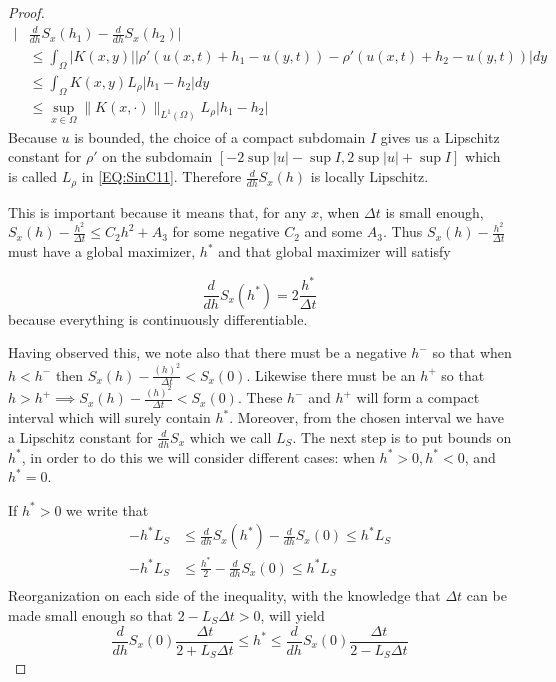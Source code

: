 \documentclass[aps,
preprint,
groupedaddress,
showkeys,
amsmath]{revtex4-2}
\begin{document}
\begin{proof}
\begin{equation}
\begin{split}
            \bigg|&\frac{d}{dh}S_x(h_1)-\frac{d}{dh}S_x(h_2)\bigg|\\
            &\leq \int_\Omega |K(x,y)| |\rho'(u(x,t)+h_1-u(y,t))-\rho'(u(x,t)+h_2-u(y,t))|dy\\
            &\leq \int_\Omega K(x,y)L_{\rho}|h_1-h_2|dy\\
            &\leq \sup_{x\in\Omega}\|K(x,\cdot)\|_{L^1(\Omega)}L_{\rho}|h_1-h_2|
            \end{split} 
        \end{equation}
        Because $u$ is bounded, the choice of a compact subdomain $I$ gives us a Lipschitz constant for $\rho'$ on the subdomain $[-2\sup |u|-\sup I,2\sup|u|+\sup I]$ which is called $L_\rho$ in \eqref{EQ:SinC11}. Therefore $\frac{d}{dh}S_x(h)$ is locally Lipschitz. 

        This is important because it means that, for any $x$, when $\Delta t$ is small enough, $S_x(h)-\frac{h^2}{\Delta t}\leq C_2h^2+A_3$ for some negative $C_2$ and some $A_3$. Thus $S_x(h)-\frac{h^2}{\Delta t}$ must have a global maximizer, $h^*$ and that global maximizer will satisfy 
        
       \[\frac{d}{dh}S_x(h^*)=2\frac{h^*}{\Delta t}\]
        because everything is continuously differentiable. 

        Having observed this, we note also that there must be a negative $h^-$ so that when $h<h^-$ then $S_x(h)-\frac{(h)^2}{\Delta t}<S_x(0)$. Likewise there must be an $h^+$ so that $h>h^+\implies S_x(h)-\frac{(h)^2}{\Delta t}<S_x(0)$.
        These $h^-$ and $h^+$ will form a compact interval which will surely contain $h^*$. Moreover, from the chosen interval we have a Lipschitz constant for $\frac{d}{dh}S_x$ which we call $L_S$.
        The next step is to put bounds on $h^*$, in order to do this we will consider different cases: when $h^*>0, h^*<0$, and $h^*=0$. 

        If $h^*>0$ we write that 
        \begin{equation*}
            \begin{split}
                -h^*L_S&\leq \frac{d}{dh}S_x(h^*)-\frac{d}{dh}S_x(0)\leq h^*L_S\\
                -h^*L_S&\leq \frac{h^*}{2}-\frac{d}{dh}S_x(0)\leq h^*L_S\\
                \end{split}
        \end{equation*} 
        Reorganization on each side of the inequality, with the knowledge that $\Delta t$ can be made small enough so that $2-L_S\Delta t>0$, will yield 
        \begin{equation*}
                \frac{d}{dh}S_x(0)\frac{\Delta t}{2+L_S\Delta t}\leq h^*\leq \frac{d}{dh}S_x(0)\frac{\Delta t}{2-L_S\Delta t}
        \end{equation*}


\end{proof}
\end{document}
